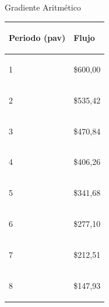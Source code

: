 \item Gradiente Aritmético
\begin{spacing}{0.1}
\begin{center}
\begin{tabular}{ |p{3.5cm}| p{3cm}|}
\hline 
\begin{center}\textbf{Periodo (pav) } \end{center}  & \begin{center} \textbf{Flujo} \end{center}  \\ \hline

\begin{center}1 \end{center}    &  \begin{center} \$600,00\end{center} \\ \hline

\begin{center}2 \end{center}    &  \begin{center} \$535,42\end{center} \\ \hline 

\begin{center}3 \end{center}    & \begin{center} \$470,84 \end{center}  \\ \hline

\begin{center}4 \end{center}    & \begin{center} \$406,26\end{center}  \\ \hline

\begin{center}5 \end{center}    & \begin{center} \$341,68 \end{center}  \\ \hline

\begin{center}6 \end{center}    & \begin{center} \$277,10 \end{center}  \\ \hline

\begin{center}7 \end{center}    & \begin{center} \$212,51\end{center}  \\ \hline

\begin{center}8 \end{center}    & \begin{center} \$147,93 \end{center} \\ \hline
\end{tabular}
\end{center}
\end{spacing}
